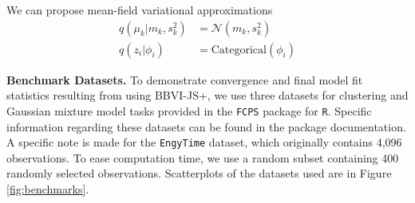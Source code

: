 \documentclass{article}
\begin{document}
We can propose mean-field variational approximations
\begin{align*}
    q(\mu_k | m_k, s^2_k) & = \mathcal{N}(m_k, s^2_k) \\
    q(z_i | \phi_i) & = \text{Categorical}(\phi_i)
\end{align*}

\textbf{Benchmark Datasets.} To demonstrate convergence and final model fit statistics resulting from using BBVI-JS+, we use three datasets for clustering and Gaussian mixture model tasks provided in the \texttt{FCPS} package \cite{FCPS} for \texttt{R}. Specific information regarding these datasets can be found in the package documentation. A specific note is made for the \texttt{EngyTime} dataset, which originally contains 4,096 observations. To ease computation time, we use a random subset containing 400 randomly selected observations. Scatterplots of the datasets used are in Figure \ref{fig:benchmarks}.
\end{document}
